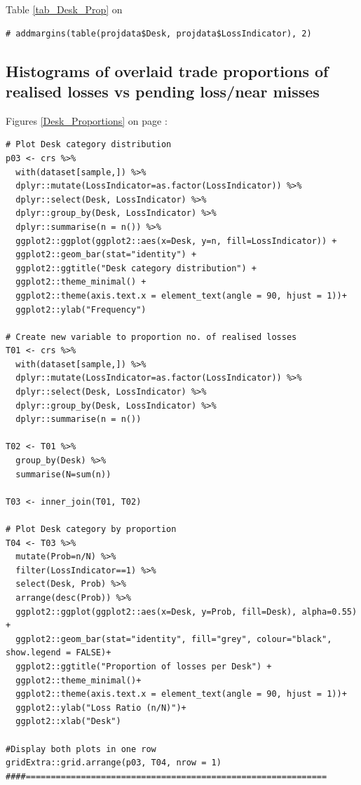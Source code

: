 \documentclass{DissertateUSU}
\begin{document}
\normalsize

Table \ref{tab_Desk_Prop} on \pageref{tab_Desk_Prop}

\small

\begin{verbatim}
# addmargins(table(projdata$Desk, projdata$LossIndicator), 2)
\end{verbatim}

\normalsize

\subsection{Histograms of overlaid trade proportions of realised losses vs pending loss/near misses}
\label{ssec:Histogram proportions}

Figures \ref{Desk_Proportions} on page \pageref{Desk_Proportions}:

\small

\begin{verbatim}
# Plot Desk category distribution
p03 <- crs %>%
  with(dataset[sample,]) %>%
  dplyr::mutate(LossIndicator=as.factor(LossIndicator)) %>%
  dplyr::select(Desk, LossIndicator) %>%
  dplyr::group_by(Desk, LossIndicator) %>%
  dplyr::summarise(n = n()) %>%
  ggplot2::ggplot(ggplot2::aes(x=Desk, y=n, fill=LossIndicator)) +
  ggplot2::geom_bar(stat="identity") +
  ggplot2::ggtitle("Desk category distribution") +
  ggplot2::theme_minimal() +
  ggplot2::theme(axis.text.x = element_text(angle = 90, hjust = 1))+
  ggplot2::ylab("Frequency")

# Create new variable to proportion no. of realised losses
T01 <- crs %>%
  with(dataset[sample,]) %>%
  dplyr::mutate(LossIndicator=as.factor(LossIndicator)) %>%
  dplyr::select(Desk, LossIndicator) %>%
  dplyr::group_by(Desk, LossIndicator) %>%
  dplyr::summarise(n = n())

T02 <- T01 %>%
  group_by(Desk) %>%
  summarise(N=sum(n))

T03 <- inner_join(T01, T02)

# Plot Desk category by proportion
T04 <- T03 %>%
  mutate(Prob=n/N) %>%
  filter(LossIndicator==1) %>%
  select(Desk, Prob) %>%
  arrange(desc(Prob)) %>%
  ggplot2::ggplot(ggplot2::aes(x=Desk, y=Prob, fill=Desk), alpha=0.55) +
  ggplot2::geom_bar(stat="identity", fill="grey", colour="black", show.legend = FALSE)+
  ggplot2::ggtitle("Proportion of losses per Desk") +
  ggplot2::theme_minimal()+
  ggplot2::theme(axis.text.x = element_text(angle = 90, hjust = 1))+
  ggplot2::ylab("Loss Ratio (n/N)")+
  ggplot2::xlab("Desk")

#Display both plots in one row
gridExtra::grid.arrange(p03, T04, nrow = 1)
####============================================================
\end{verbatim}
\end{document}
